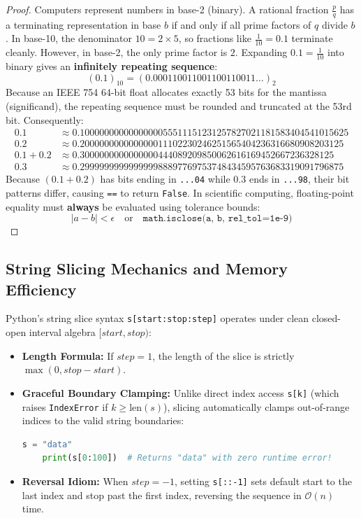 \begin{proof}
Computers represent numbers in base-2 (binary). A rational fraction $\frac{p}{q}$ has a terminating representation in base $b$ if and only if all prime factors of $q$ divide $b$.
In base-10, the denominator $10 = 2 \times 5$, so fractions like $\frac{1}{10} = 0.1$ terminate cleanly.
However, in base-2, the only prime factor is $2$. Expanding $0.1 = \frac{1}{10}$ into binary gives an \textbf{infinitely repeating sequence}:
\begin{equation*}
(0.1)_{10} = (0.000110011001100110011\dots)_2
\end{equation*}
Because an IEEE 754 64-bit float allocates exactly 53 bits for the mantissa (significand), the repeating sequence must be rounded and truncated at the 53rd bit.
Consequently:
\begin{align*}
0.1 &\approx 0.1000000000000000055511151231257827021181583404541015625 \\
0.2 &\approx 0.200000000000000011102230246251565404236316680908203125 \\
0.1 + 0.2 &\approx 0.3000000000000000444089209850062616169452667236328125 \\
0.3 &\approx 0.299999999999999988897769753748434595763683319091796875
\end{align*}
Because $(0.1 + 0.2)$ has bits ending in \texttt{...04} while $0.3$ ends in \texttt{...98}, their bit patterns differ, causing \texttt{==} to return \texttt{False}.
In scientific computing, floating-point equality must \textbf{always} be evaluated using tolerance bounds:
\begin{equation}
|a - b| < \epsilon \quad \text{or} \quad \texttt{math.isclose(a, b, rel\_tol=1e-9)}
\end{equation}
\end{proof}

\subsection{String Slicing Mechanics and Memory Efficiency}

Python's string slice syntax \texttt{s[start:stop:step]} operates under clean closed-open interval algebra $[start, stop)$:
\begin{itemize}
    \item \textbf{Length Formula:} If $step = 1$, the length of the slice is strictly $\max(0, stop - start)$.
    \item \textbf{Graceful Boundary Clamping:} Unlike direct index access \texttt{s[k]} (which raises \texttt{IndexError} if $k \ge \text{len}(s)$), slicing automatically clamps out-of-range indices to the valid string boundaries:
    \begin{lstlisting}[language=Python]
    s = "data"
    print(s[0:100])  # Returns "data" with zero runtime error!
    \end{lstlisting}
    \item \textbf{Reversal Idiom:} When $step = -1$, setting \texttt{s[::-1]} sets default start to the last index and stop past the first index, reversing the sequence in $\mathcal{O}(n)$ time.
\end{itemize}

